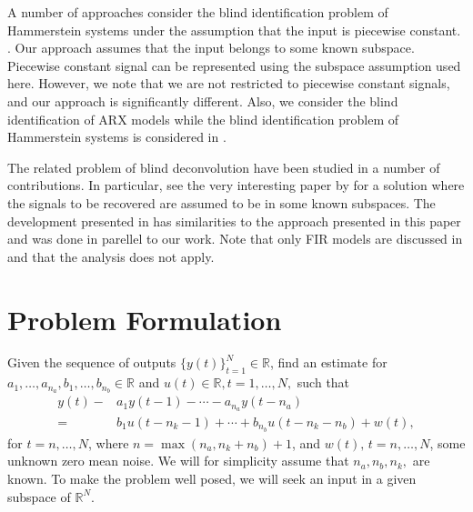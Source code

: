 \documentclass{ifacconf}
\renewcommand{\b}{{ b}}
\newcommand{\0}{{\bf 0}}
\renewcommand{\a}{a}
\renewcommand{\Re}{{\mathbb{R}}}
\begin{document}
A number of approaches consider the blind identification problem of
Hammerstein systems under the assumption that the input is piecewise
constant. \cite{Sun99,BaiLD02,Bai02,Wang07,Wang09,Wang10}. Our approach assumes that the input belongs to
some known subspace.  Piecewise constant signal can be represented
using the subspace assumption used here. However, we note that we
are not restricted to piecewise constant signals, and our approach is
significantly different. Also, we consider the blind identification of
ARX models while the blind identification problem of
Hammerstein systems is considered in
\cite{Sun99,BaiLD02,Bai02,Wang07,Wang09,Wang10}.  























The related problem of blind deconvolution have
been studied in a number of contributions. In particular,  see the
very interesting paper by
\cite{Ahmed:12} for a solution where the signals to be recovered are
assumed to be in some known subspaces. The development presented in
\cite{Ahmed:12} has similarities to the approach presented in this
paper and was done in parellel to our work. Note that only FIR models
are discussed in \cite{Ahmed:12}  and that the analysis does not apply.



\section{Problem Formulation}
Given the sequence of outputs $\{y(t)\}_{t=1}^N \in \Re$, find an estimate for  $\a_1,\dots,
\a_{n_a},\b_1,\dots, \b_{n_b} \in \Re$ and  $u(t) \in \Re,t=1,\dots,N,$ such that  
\begin{align*}\nonumber
y(t)-&\a_1 y(t-1) 
- \cdots - \a_{n_a} y(t-n_a) \\=&
\b_1 u(t-n_k - 1) 
+\cdots +\b_{n_b} u(t-n_k - n_b)+w(t),
\end{align*} for  $t=n,\dots,N$, where $n=\max( n_a, n_k+n_b)+1$, and $w(t),\,t=n,\dots,N$, 
some unknown zero mean noise.
We will for simplicity assume that $n_a, n_b, n_k,$ are
known. To make the problem well posed, we will seek an input in a given
subspace of $\Re^N$. 
\end{document}
